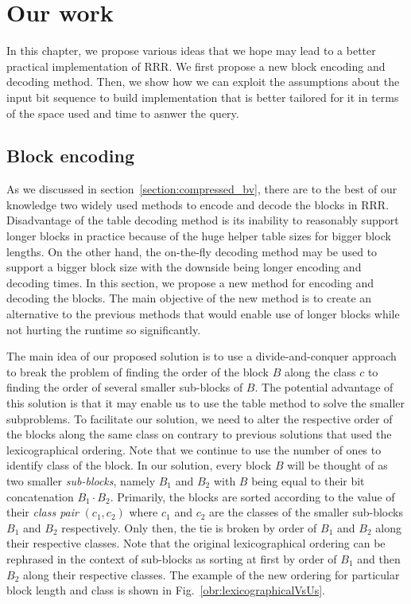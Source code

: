 \chapter{Our work}
\label{kap:kap3}

In this chapter, we propose various ideas that we hope may lead to a better practical
implementation of RRR. We first propose a new block encoding and decoding method.
Then, we show how we can exploit the assumptions about the input bit sequence to build
implementation that is better tailored for it in terms of the space used and time to
asnwer the query.

\section{Block encoding}

As we discussed in section~\ref{section:compressed_bv}, there are to
the best of our knowledge two widely used methods to encode and decode the
blocks in RRR. Disadvantage of the table decoding method is its inability
to reasonably support longer blocks in practice because of the
huge helper table sizes for bigger block lengths. On the other hand, the on-the-fly
decoding method may be used to support a bigger block size with the downside
being longer encoding and decoding times. In this section, we propose a new
method for encoding and decoding the blocks. The main objective of the new
method is to create an alternative to the previous methods that would enable use
of longer blocks while not hurting the runtime so significantly.

The main idea of our proposed solution is to use a divide-and-conquer approach to
break the problem of finding the order of the block $B$ along the class $c$ to
finding the order of several smaller sub-blocks of $B$. The potential advantage of this
solution is that it may enable us to use the table method to solve the smaller
subproblems. To facilitate our solution, we need to alter the respective order
of the blocks along the same class on contrary to previous solutions that used the
lexicographical ordering. Note that we continue to use the number of ones to identify class of
the block. In our solution, every block $B$ will
be thought of as two smaller \textit{sub-blocks}, namely $B_1$ and $B_2$ with $B$ being equal
to their bit concatenation $B_1\cdot B_2$. Primarily, the blocks are sorted according to the
value of their \textit{class pair} $(c_1, c_2)$ where $c_1$ and $c_2$ are the classes of the
smaller sub-blocks $B_1$ and $B_2$ respectively. Only then, the tie is broken by order of $B_1$
and $B_2$ along their respective classes. Note that the original lexicographical ordering can
be rephrased in the context of sub-blocks as sorting at first by order of $B_1$ and then $B_2$
along their respective classes. The example of the new ordering for particular block length and
class is shown in Fig.~\ref{obr:lexicographicalVsUs}.

